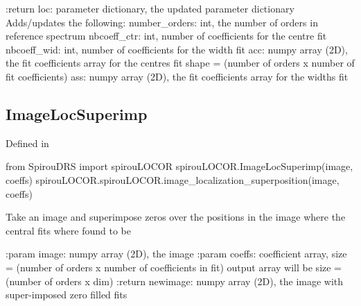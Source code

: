 \begin{minipage}{\textwidth}
\begin{pythondocstring}
:return loc: parameter dictionary, the updated parameter dictionary
        Adds/updates the following:
            number_orders: int, the number of orders in reference spectrum
            nbcoeff_ctr: int, number of coefficients for the centre fit
            nbcoeff_wid: int, number of coefficients for the width fit
            acc: numpy array (2D), the fit coefficients array for
                  the centres fit
                  shape = (number of orders x number of fit coefficients)
            ass: numpy array (2D), the fit coefficients array for
                  the widths fit
\end{pythondocstring}
\end{minipage}

\noindent\begin{minipage}{\textwidth}
\subsection{ImageLocSuperimp}

Defined in \spirouLOCOR{}

\begin{pythonbox}
from SpirouDRS import spirouLOCOR
spirouLOCOR.ImageLocSuperimp(image, coeffs)
spirouLOCOR.spirouLOCOR.image_localization_superposition(image, coeffs)
\end{pythonbox}

\begin{pythondocstring}
Take an image and superimpose zeros over the positions in the image where
the central fits where found to be

:param image: numpy array (2D), the image
:param coeffs: coefficient array,
               size = (number of orders x number of coefficients in fit)
               output array will be size = (number of orders x dim)
:return newimage: numpy array (2D), the image with super-imposed zero filled
                  fits
\end{pythondocstring}
\end{minipage}

